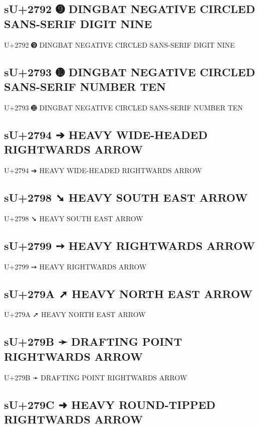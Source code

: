 \subsection{sU+2792 ➒ DINGBAT NEGATIVE CIRCLED SANS-SERIF DIGIT NINE}

U+2792 ➒ DINGBAT NEGATIVE CIRCLED SANS-SERIF DIGIT NINE

\subsection{sU+2793 ➓ DINGBAT NEGATIVE CIRCLED SANS-SERIF NUMBER TEN}

U+2793 ➓ DINGBAT NEGATIVE CIRCLED SANS-SERIF NUMBER TEN

\subsection{sU+2794 ➔ HEAVY WIDE-HEADED RIGHTWARDS ARROW}

U+2794 ➔ HEAVY WIDE-HEADED RIGHTWARDS ARROW

\subsection{sU+2798 ➘ HEAVY SOUTH EAST ARROW}

U+2798 ➘ HEAVY SOUTH EAST ARROW

\subsection{sU+2799 ➙ HEAVY RIGHTWARDS ARROW}

U+2799 ➙ HEAVY RIGHTWARDS ARROW

\subsection{sU+279A ➚ HEAVY NORTH EAST ARROW}

U+279A ➚ HEAVY NORTH EAST ARROW

\subsection{sU+279B ➛ DRAFTING POINT RIGHTWARDS ARROW}

U+279B ➛ DRAFTING POINT RIGHTWARDS ARROW

\subsection{sU+279C ➜ HEAVY ROUND-TIPPED RIGHTWARDS ARROW}

